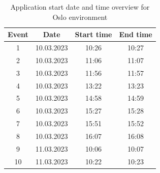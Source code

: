 \begin{table}[H]
\centering
\caption{Application start date and time overview for Oslo environment}
\label{tab:AS_dateandtimeOslo}
\begin{tabular}{|c|c|c|c|}
\hline
\textbf{Event} & \textbf{Date} & \textbf{Start time} & \textbf{End time} \\ \hline
1              & 10.03.2023         & 10:26               & 10:27             \\ \hline
2              & 10.03.2023         & 11:06               & 11:07             \\ \hline
3              & 10.03.2023         & 11:56               & 11:57             \\ \hline
4              & 10.03.2023         & 13:22               & 13:23             \\ \hline
5              & 10.03.2023         & 14:58               & 14:59             \\ \hline
6              & 10.03.2023         & 15:27               & 15:28             \\ \hline
7              & 10.03.2023         & 15:51               & 15:52             \\ \hline
8              & 10.03.2023         & 16:07               & 16:08             \\ \hline
9              & 11.03.2023         & 10:06               & 10:07             \\ \hline
10             & 11.03.2023         & 10:22               & 10:23             \\ \hline
\end{tabular}
\end{table}

